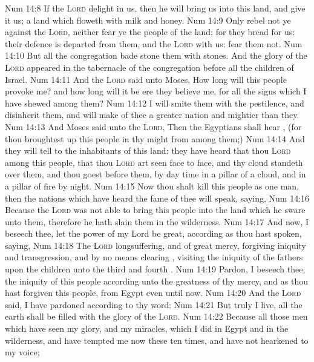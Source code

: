 \vs Num 14:8 If the \textsc{Lord} delight in us, then he will bring us into this land, and give it us; a land which floweth with milk and honey.
\vs Num 14:9 Only rebel not ye against the \textsc{Lord}, neither fear ye the people of the land; for they  bread for us: their defence is departed from them, and the \textsc{Lord}  with us: fear them not.
\vs Num 14:10 But all the congregation bade stone them with stones. And the glory of the \textsc{Lord} appeared in the tabernacle of the congregation before all the children of Israel.
\vs Num 14:11 And the \textsc{Lord} said unto Moses, How long will this people provoke me? and how long will it be ere they believe me, for all the signs which I have shewed among them?
\vs Num 14:12 I will smite them with the pestilence, and disinherit them, and will make of thee a greater nation and mightier than they.
\vs Num 14:13 And Moses said unto the \textsc{Lord}, Then the Egyptians shall hear , (for thou broughtest up this people in thy might from among them;)
\vs Num 14:14 And they will tell  to the inhabitants of this land:  they have heard that thou \textsc{Lord}  among this people, that thou \textsc{Lord} art seen face to face, and  thy cloud standeth over them, and  thou goest before them, by day time in a pillar of a cloud, and in a pillar of fire by night.
\vs Num 14:15 Now  thou shalt kill  this people as one man, then the nations which have heard the fame of thee will speak, saying,
\vs Num 14:16 Because the \textsc{Lord} was not able to bring this people into the land which he sware unto them, therefore he hath slain them in the wilderness.
\vs Num 14:17 And now, I beseech thee, let the power of my Lord be great, according as thou hast spoken, saying,
\vs Num 14:18 The \textsc{Lord}  longsuffering, and of great mercy, forgiving iniquity and transgression, and by no means clearing , visiting the iniquity of the fathers upon the children unto the third and fourth .
\vs Num 14:19 Pardon, I beseech thee, the iniquity of this people according unto the greatness of thy mercy, and as thou hast forgiven this people, from Egypt even until now.
\vs Num 14:20 And the \textsc{Lord} said, I have pardoned according to thy word:
\vs Num 14:21 But  truly  I live, all the earth shall be filled with the glory of the \textsc{Lord}.
\vs Num 14:22 Because all those men which have seen my glory, and my miracles, which I did in Egypt and in the wilderness, and have tempted me now these ten times, and have not hearkened to my voice;
